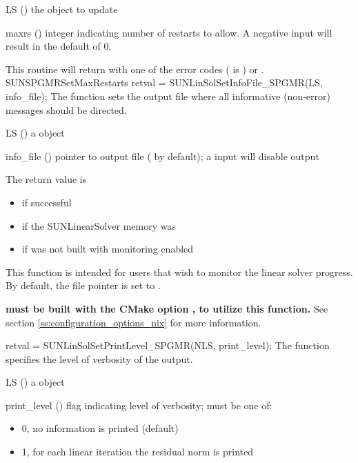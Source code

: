 {
  \begin{args}[maxrs]
  \item[LS] ()
    the {\sunlinsolspgmr} object to update
  \item[maxrs] ()
    integer indicating number of restarts to allow.  A negative input
    will result in the default of 0.
  \end{args}
}
{
  This routine will return with one of the error codes
   ( is ) or .
}
{}
{SUNSPGMRSetMaxRestarts}
%
%
{
  retval = SUNLinSolSetInfoFile\_SPGMR(LS, info\_file);
}
{
  The function  sets the
  output file where all informative (non-error) messages should be directed.
}
{
  \begin{args}
    \item[LS] ()
      a {\sunnonlinsol} object
    \item[info\_file] () pointer to output file ( by default);
      a  input will disable output
  \end{args}
}
{
  The return value is
  \begin{itemize}
    \item {} if successful
    \item {} if the SUNLinearSolver memory was 
    \item {} if {\sundials} was not built with monitoring enabled
  \end{itemize}
}
{
  This function is intended for users that wish to monitor the linear
  solver progress. By default, the file pointer is set to .

  \textbf{{\sundials} must be built with the CMake option
  , to utilize this function.}
  See section \ref{ss:configuration_options_nix} for more information.
}
%
%
{
  retval = SUNLinSolSetPrintLevel\_SPGMR(NLS, print\_level);
}
{
  The function  specifies the level
  of verbosity of the output.
}
{
  \begin{args}
  \item[LS] ()
    a {\sunnonlinsol} object
  \item[print\_level] () flag indicating level of verbosity;
    must be one of:
    \begin{itemize}
      \item 0, no information is printed (default)
      \item 1, for each linear iteration the residual norm is printed
    \end{itemize}
  \end{args}
}
